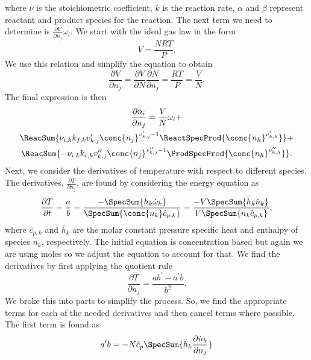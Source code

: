 where $\nu$ is the stoichiometric coefficient, $k$ is the reaction rate, $\alpha$ and $\beta$ represent reactant and product species for the reaction.
The next term we need to determine is $\frac{\partial V}{\partial n_j} \omega_i$.
We start with the ideal gas law in the form
\begin{equation}
     V = \frac{NRT}{P}.
\end{equation}
We use this relation and simplify the equation to obtain
\begin{equation}
    \frac{\partial V}{\partial n_j} = \frac{\partial V}{\partial N}\frac{\partial N}{\partial n_j} = \frac{RT}{P} = \frac{V}{N}.
\end{equation}
The final expression is then
\begin{multline}
    \frac{\partial \dot{n}_i}{\partial n_j} = \frac{V}{N} \omega_i + \\
    \ReacSum{\nu_{i,k} k_{f,k}{v_{k,j}^\prime} \conc{n_j}^{v_{k,j}^\prime-1}\ReactSpecProd{\conc{n_h}^{v_{k,h}^\prime}}} + \\
    \ReacSum{-\nu_{i,k} k_{r,k}v_{k,j}^{\prime\prime}\conc{n_j}^{v_{k,j}^{\prime\prime}-1}\ProdSpecProd{\conc{n_h}^{v_{k,h}^{\prime\prime}}}}.
\end{multline}
%
%
Next, we consider the derivatives of temperature with respect to different species.
The derivatives, $\frac{\partial\dot{T}}{\partial n_j}$, are found by considering the energy equation as
\begin{equation}
    \frac{\partial T}{\partial t} = \frac{a}{b} = \frac{-\SpecSum{\bar{h}_k\dot{\omega}_k}}{\SpecSum{\conc{n_k} \hat{c}_{p,k}}} = \frac{-V\SpecSum{\bar{h}_k\dot{n}_k}}{V \SpecSum{n_k \hat{c}_{p,k}}},
\end{equation}
where $\hat{c}_{p,k}$ and $\bar{h}_k$ are the molar constant pressure specific heat and enthalpy of species $n_k$, respectively.
The initial equation is concentration based but again we are using moles so we adjust the equation to account for that.
We find the derivatives by first applying the quotient rule
\begin{equation}
    \frac{\partial \dot{T}}{\partial n_j} = \frac{ab^\prime-a^\prime b}{b^2}.
\end{equation}
We broke this into parts  to simplify the process.
So, we find the appropriate terms for each of the needed derivatives and then cancel terms where possible.
The first term is found as
\begin{equation}
    a^\prime b = -N\hat{c}_p\SpecSum{\bar{h}_k \frac{\partial \dot{n}_k}{\partial n_j}}
\end{equation}
